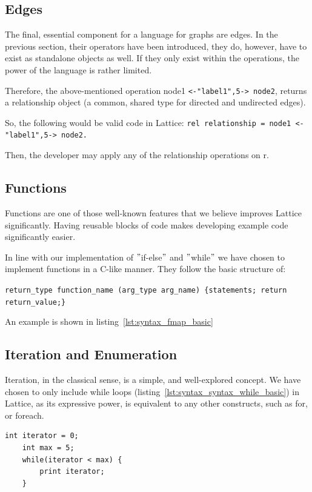 \subsection{Edges}\label{subsec:syntax_edges}
The final, essential component for a language for graphs are edges.
In the previous section, their operators have been introduced,
they do, however, have to exist as standalone objects as well.
If they only exist within the operations, the power of the language is rather
limited.

Therefore, the above-mentioned operation node1 \lstinline{<-"label1",5-> node2}, returns a relationship object (a common, shared
type for directed and undirected edges).

So, the following would be valid code in Lattice: \lstinline{rel relationship = node1 <-"label1",5-> node2.}

Then, the developer may apply any of the relationship operations on r.

\subsection{Functions}\label{subsec:syntax_functions}
Functions are one of those well-known features that we believe improves Lattice significantly.
Having reusable blocks of code makes developing example code significantly easier.

In line with our implementation of \("\)if-else\("\) and \("\)while\("\) we have chosen to implement functions in a C-like manner.
They follow the basic structure of:

\lstinline|return_type function_name (arg_type arg_name) {statements; return return_value;}|

An example is shown in listing~\ref{lst:syntax_fmap_basic}

\subsection{Iteration and Enumeration}\label{subsec:syntax_iteration-and-enumeration}
Iteration, in the classical sense, is a simple, and well-explored concept.
We have chosen to only include while loops (listing~\ref{lst:syntax_syntax_while_basic})
in Lattice, as its expressive power, is equivalent to any other constructs, such as for, or foreach.

\begin{lstlisting}[caption={Simple while loop.},captionpos=b,label={lst:syntax_syntax_while_basic}]
    int iterator = 0;
    int max = 5;
    while(iterator < max) {
        print iterator;
    }
\end{lstlisting}


